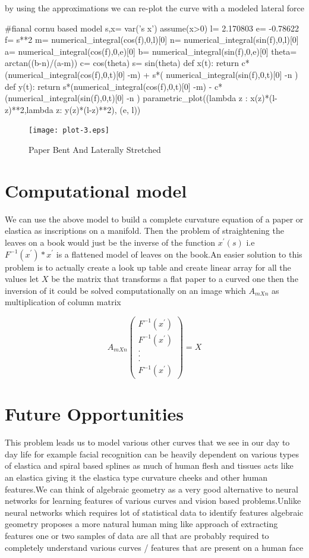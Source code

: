 \documentclass[longbibliography]{revtex4-1}
\begin{document}
 by using the approximations we can re-plot the curve with a modeled lateral force

\begin{sageblock}
#fianal cornu based model
s,x= var('s x')
assume(x>0)
l= 2.170803
e= -0.78622
f= s**2
m= numerical_integral(cos(f),0,l)[0]
n= numerical_integral(sin(f),0,l)[0]
a= numerical_integral(cos(f),0,e)[0]
b= numerical_integral(sin(f),0,e)[0]
theta= arctan((b-n)/(a-m))
c= cos(theta)
s= sin(theta)
def x(t): return c*(numerical_integral(cos(f),0,t)[0] -m) + s*( numerical_integral(sin(f),0,t)[0] -n )
def y(t): return s*(numerical_integral(cos(f),0,t)[0] -m) - c*(numerical_integral(sin(f),0,t)[0] -n )
parametric_plot((lambda z : x(z)*(l-z)**2,lambda z: y(z)*(l-z)**2), (e, l))
\end{sageblock}

\begin{figure}
\centering
\texttt{[image: plot-3.eps]}
\caption{Paper Bent And Laterally Stretched}
\end{figure}

\section{Computational model}
We can use the above model to build a complete curvature equation of a paper or elastica as inscriptions on a manifold.
Then the problem of straightening the leaves on a book would just be the inverse of the function $x^{'}(s)$
i.e $F^{-1}(x^{'})*x^{'}$ is a flattened model of leaves on the book.An easier solution to this problem is to actually create a look up table and create linear array for all the values let $X$ be the matrix that transforms a flat paper to a curved one then the inversion of it could be solved computationally on an image which $A_{mXn}$ as multiplication of column matrix

\[A_{mXn} \left( \begin{array}{ccc}
F^{-1}(x^{'}) \\
F^{-1}(x^{'}) \\
.\\
.\\
.\\
F^{-1}(x^{'}) \end{array} \right) = X\] 

\section{Future Opportunities}
This problem leads us to model various other curves that we see in our day to day life for example facial recognition can be heavily dependent on various types of elastica and spiral based splines as much of human flesh and tissues acts like an elastica  giving it the elastica type curvature cheeks and other human features.We can think of algebraic geometry as a very good alternative to neural networks for learning features of various curves and vision based problems.Unlike neural networks which requires lot of statistical data to identify  features algebraic geometry proposes a more natural human ming like approach of extracting features one or two samples of data are all that are probably required to completely understand various curves / features that are present on a human face
\end{document}
